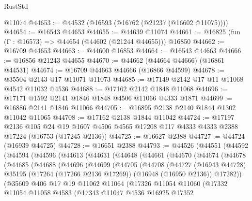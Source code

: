 \begin{lexlean}{RustStd}
\begin{coremodule}
    @11074
@44653 := @44532 (@16593 (@16762 (@21237 (@16602 @11075))))
@44654 := @16543 @44653
@44655 := @44639 @11074
@44661 := @16825 (fun (Γ : @16573) => @44654 (@44602 (@21244 @44655))) @16850
@44662 := @16709 @44653
@44663 := @44600 @16853
@44664 := @16543 @44663
@44666 := @16856 @21243 @44655
@44670 := @44662 (@44664 @44666) (@16861 @44531)
@44674 := @16709 @44663 @44666 (@16866 @44599)
@44678 := @35504 @2143 @17 @11071 @11073
@44685 := @17149 @2142 @17 @11 @11068 @4542 @11032 @4536
@44688 := @17162 @2142 @1848 @11068
@44696 := @17171 @1592 @2141 @1846 @1848 @4506 @11066 @4333 @1871
@44699 := @16886 @2141 @1846 @11066
@44705 := @16895 @2138 @2140 @1844 @1302 @11042 @11065
@44708 := @17162 @2138 @1844 @11042
@44724 := @17197
    @2136
    @105
    @24
    @19
    @1607
    @4506
    @4565
    @17208
    @117
    @4333
    @4333
    @2388
    @17224
    (@16753 (@17245 @2136))
@44725 := @16627 @2388
@44727 := @44724 (@16939 @44725)
@44728 := @16651 @2388
@44793 := @44526
    (@44551
      (@44592
        (@44594
          (@44596
            (@44613
              (@44631
                (@44648
                  (@44661
                    (@44670
                      (@44674
                        (@44678
                          (@44685
                            (@44688
                              (@44696
                                (@44699
                                  (@44705
                                    (@44708
                                      (@44727
                                        (@16943 @44728)
                                        @35195
                                        (@17264 (@17266 @2136 @17269))
                                        (@16948 (@16950 @2136))
                                        @17282))
                                    (@35609
                                      @406
                                      @17
                                      @19
                                      @11062
                                      @11064
                                      (@17326
                                        @11054
                                        @11060
                                        (@17332
                                          @11054
                                          @11058
                                          @4583
                                          (@17343
                                            @11047
                                            @4536
                                            @16925
                                            @17352

\end{coremodule}
\end{lexlean}
